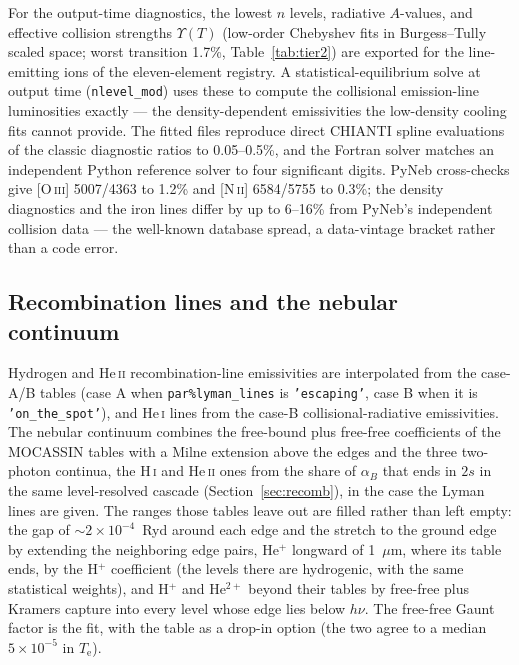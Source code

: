 \documentclass[twocolumn,linenumbers]{aastex702}
\newcommand{\code}[1]{\texttt{#1}}
\newcommand{\HI}{H\,\textsc{i}}
\newcommand{\HeI}{He\,\textsc{i}}
\newcommand{\HeII}{He\,\textsc{ii}}
\newcommand{\Te}{T_{\mathrm{e}}}
\begin{document}
For the
output-time diagnostics, the lowest $n$ levels, radiative $A$-values, and
effective collision strengths $\Upsilon(T)$ (low-order Chebyshev fits in
Burgess--Tully scaled space; worst transition 1.7\%,
Table~\ref{tab:tier2}) are exported for the line-emitting ions of the
eleven-element registry.  A statistical-equilibrium solve at output time
(\code{nlevel\_mod}) uses these to compute the collisional emission-line
luminosities exactly --- the density-dependent emissivities the
low-density cooling fits cannot provide.  The fitted files reproduce direct
CHIANTI spline evaluations of the classic diagnostic ratios to 0.05--0.5\%,
and the Fortran solver matches an independent Python reference solver to
four significant digits.  PyNeb cross-checks give [\textsc{O\,iii}]
5007/4363 to 1.2\% and [\textsc{N\,ii}] 6584/5755 to 0.3\%; the density
diagnostics and the iron lines differ by up to 6--16\% from PyNeb's
independent collision data --- the well-known database spread, a
data-vintage bracket rather than a code error.

\subsection{Recombination lines and the nebular continuum}
\label{sec:reclines}

Hydrogen and \HeII{} recombination-line emissivities are interpolated from
the \citet{storey1995} case-A/B tables (case A when \code{par\%lyman\_lines}
is \code{'escaping'}, case B when it is \code{'on\_the\_spot'}),
and \HeI{} lines from the \citet{porter2012,porter2013} case-B
collisional-radiative emissivities.  The nebular continuum combines the
free-bound plus free-free coefficients of the MOCASSIN
\citep{ercolano2006} tables with a Milne extension above the edges and the
three two-photon continua, the \HI{} and \HeII{} ones from the share of
$\alpha_B$ that ends in $2s$ in the same level-resolved cascade
(Section~\ref{sec:recomb}), in the case the Lyman lines are given.  The
ranges those tables leave out are filled rather than left empty: the gap of
$\sim$$2\times10^{-4}$~Ryd around each edge and the stretch to the ground
edge by extending the neighboring edge pairs, He$^{+}$ longward of
1~$\mu$m, where its table ends, by the H$^{+}$ coefficient (the levels there
are hydrogenic, with the same statistical weights), and H$^{+}$ and
He$^{2+}$ beyond their tables by free-free plus Kramers capture into every
level whose edge lies below $h\nu$.  The free-free Gaunt factor is the
\citet{hummer1988} fit, with the \citet{vanhoof2014} table as a drop-in
option (the two agree to a median $5\times10^{-5}$ in $\Te$).
\end{document}
